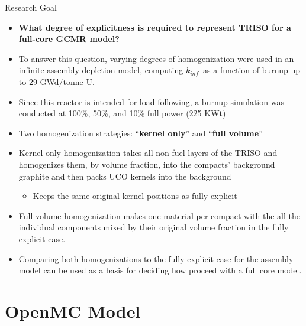 \documentclass[9pt,t,aspectratio=169]{beamer}
\newcommand{\kinf}{$k_{inf}$}
\begin{document}
\begin{frame}{Research Goal}
    \begin{itemize}
        \item \textbf{What degree of explicitness is required to represent TRISO for a full-core GCMR model?}
        \item To answer this question, varying degrees of homogenization were used in an infinite-assembly depletion model, computing \kinf~as a function of burnup up to 29 GWd/tonne-U.
        \item Since this reactor is intended for load-following, a burnup simulation was conducted at 100\%, 50\%, and 10\% full power (225 KWt)
        \item Two homogenization strategies: ``\textbf{kernel only}'' and ``\textbf{full volume}''
        \item Kernel only homogenization takes all non-fuel layers of the TRISO and homogenizes them, by volume fraction, into the compacts' background graphite and then packs UCO kernels into the background
        \begin{itemize}
            \item Keeps the same original kernel positions as fully explicit
        \end{itemize}
        \item Full volume homogenization makes one material per compact with the all the individual components mixed by their original volume fraction in the fully explicit case.
        \item Comparing both homogenizations to the fully explicit case for the assembly model can be used as a basis for deciding how proceed with a full core model.
    \end{itemize}
\end{frame}

\section{OpenMC Model}
\end{document}
